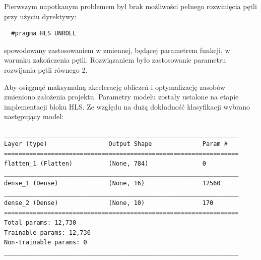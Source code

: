 Pierwszym napotkanym problemem był brak możliwości pełnego rozwinięcia pętli przy użyciu dyrektywy:
\begin{verbatim}
  #pragma HLS UNROLL
\end{verbatim}
spowodowany zastosowaniem w zmiennej, będącej parametrem funkcji, w warunku zakończenia pętli. Rozwiązaniem było zastosowanie parametru rozwijania pętli równego 2.








Aby osiągnąć maksymalną akcelerację obliczeń i optymalizację zasobów zmieniono założenia projektu. Parametry modelu zostały ustalone na etapie implementacji bloku HLS. Ze względu na dużą dokładność klasyfikacji wybrano następujący model:

\begin{verbatim}
_________________________________________________________________
Layer (type)                 Output Shape              Param #   
=================================================================
flatten_1 (Flatten)          (None, 784)               0         
_________________________________________________________________
dense_1 (Dense)              (None, 16)                12560     
_________________________________________________________________
dense_2 (Dense)              (None, 10)                170       
=================================================================
Total params: 12,730
Trainable params: 12,730
Non-trainable params: 0
_________________________________________________________________
\end{verbatim}

